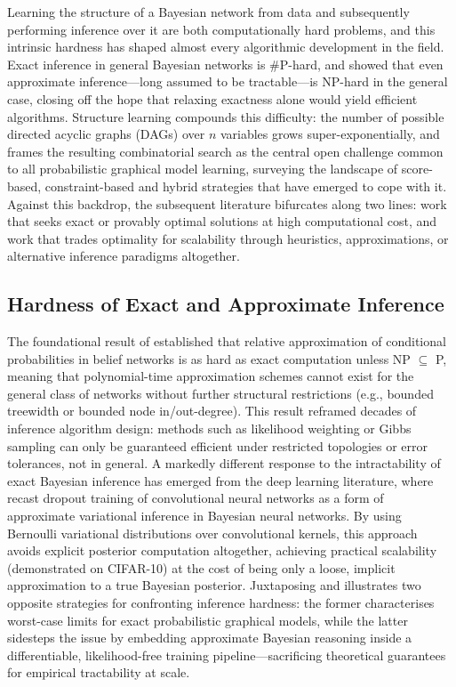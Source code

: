 Learning the structure of a Bayesian network from data and subsequently performing inference over it are both computationally hard problems, and this intrinsic hardness has shaped almost every algorithmic development in the field. Exact inference in general Bayesian networks is \#P-hard, and \cite{dagum1993approximating} showed that even approximate inference---long assumed to be tractable---is NP-hard in the general case, closing off the hope that relaxing exactness alone would yield efficient algorithms. Structure learning compounds this difficulty: the number of possible directed acyclic graphs (DAGs) over $n$ variables grows super-exponentially, and \cite{zhou2011structure} frames the resulting combinatorial search as the central open challenge common to all probabilistic graphical model learning, surveying the landscape of score-based, constraint-based and hybrid strategies that have emerged to cope with it. Against this backdrop, the subsequent literature bifurcates along two lines: work that seeks exact or provably optimal solutions at high computational cost, and work that trades optimality for scalability through heuristics, approximations, or alternative inference paradigms altogether.

\subsection{Hardness of Exact and Approximate Inference}
The foundational result of \cite{dagum1993approximating} established that relative approximation of conditional probabilities in belief networks is as hard as exact computation unless NP $\subseteq$ P, meaning that polynomial-time approximation schemes cannot exist for the general class of networks without further structural restrictions (e.g., bounded treewidth or bounded node in/out-degree). This result reframed decades of inference algorithm design: methods such as likelihood weighting or Gibbs sampling can only be guaranteed efficient under restricted topologies or error tolerances, not in general. A markedly different response to the intractability of exact Bayesian inference has emerged from the deep learning literature, where \cite{gal2015bayesian} recast dropout training of convolutional neural networks as a form of approximate variational inference in Bayesian neural networks. By using Bernoulli variational distributions over convolutional kernels, this approach avoids explicit posterior computation altogether, achieving practical scalability (demonstrated on CIFAR-10) at the cost of being only a loose, implicit approximation to a true Bayesian posterior. Juxtaposing \cite{dagum1993approximating} and \cite{gal2015bayesian} illustrates two opposite strategies for confronting inference hardness: the former characterises worst-case limits for exact probabilistic graphical models, while the latter sidesteps the issue by embedding approximate Bayesian reasoning inside a differentiable, likelihood-free training pipeline---sacrificing theoretical guarantees for empirical tractability at scale.

